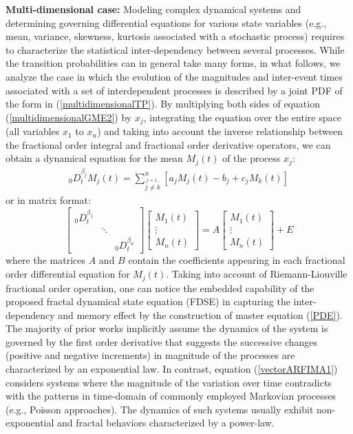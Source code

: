 \textbf{Multi-dimensional case:} Modeling complex dynamical systems and determining governing differential equations for various state variables (e.g., mean, variance, skewness, kurtosis associated with a stochastic process) requires to characterize the statistical inter-dependency between several processes. While the transition probabilities can in general take many forms, in what follows, we analyze the case in which the evolution of the magnitudes and inter-event times associated with a set of interdependent processes is described by a joint PDF of the form in (\ref{multidimensionalTP}). By multiplying both sides of equation (\ref{multidimensionalGME2}) by $x_{j}$, integrating the equation over the entire space (all variables $x_{1}$ to $x_{n}$) and taking into account the inverse relationship between the fractional order integral and fractional order derivative operators, we can obtain a dynamical equation for the mean $M_{j}(t)$ of the process $x_{j}$:
\begin{eqnarray}
\label{vectorARFIMA}
& _{0}D_{t}^{\beta_{j}} M_{j}(t) =  \sum_{\stackrel{ j =1 ,}{ j \neq k }}^{n} [ a_{j}M_{j}(t) - b_{j} + c_{j} M_{k}(t)  ]&
\end{eqnarray}
or in matrix format:
\begin{equation}
\label{vectorARFIMA1}
\left[ \begin{array}{ccc}
_{0}D_{t}^{\beta_{1}}&\\
&\ddots &\\
&& _{0}D_{t}^{\beta_{n}}
\end{array}
\right] 
\left[ \begin{array}{c}
M_{1}(t)\\
\vdots\\
M_{n}(t)
\end{array}
\right] = A \left[ \begin{array}{c}
M_{1}(t)\\
\vdots\\
M_{n}(t)
\end{array} \right] + E
\end{equation}
where the matrices $A$ and $B$ contain the coefficients appearing in each fractional order differential equation for $M_{j}(t)$. Taking into account of Riemann-Liouville fractional order operation, one can notice the embedded capability of the proposed fractal dynamical state equation (FDSE) in capturing the inter-dependency and memory effect by the construction of master equation (\ref{PDE}). The majority of prior works implicitly assume the dynamics of the system is governed by the first order derivative that suggests the successive changes (positive and negative increments) in magnitude of the processes are characterized by an exponential law. In contrast, equation (\ref{vectorARFIMA1}) considers systems where the magnitude of the variation over time contradicts with the patterns in time-domain of commonly employed Markovian processes  (e.g., Poisson approaches). The dynamics of such systems usually exhibit non-exponential and fractal behaviors characterized by a power-law.
